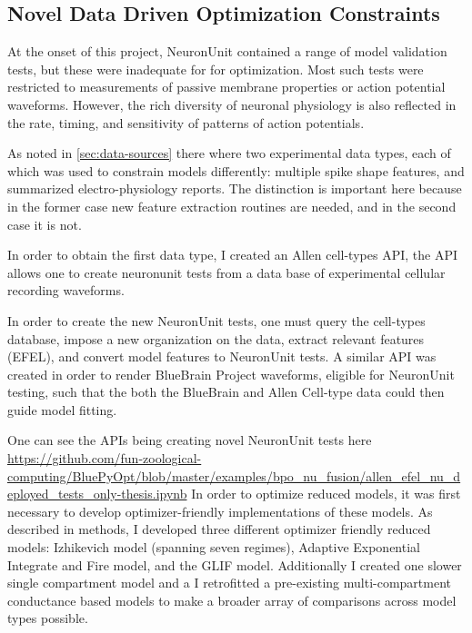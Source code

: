 \subsection{Novel Data Driven Optimization Constraints}
At the onset of this project, NeuronUnit contained a range of model validation tests, but these were inadequate for for optimization.
Most such tests were restricted to measurements of passive membrane properties or action potential waveforms.
However, the rich diversity of neuronal physiology is also reflected in the rate, timing, and sensitivity of patterns of action potentials.

As noted in \ref{sec:data-sources} there where two experimental data types, each of which was used to constrain models differently: multiple spike shape features, and summarized electro-physiology reports. The distinction is important here because in the former case new feature extraction routines are needed, and in the second case it is not.

In order to obtain the first data type, I created an Allen cell-types API, the API allows one to create neuronunit tests from a data base of experimental cellular recording waveforms.

In order to create the new NeuronUnit tests, one must query the cell-types database, impose a new organization on the data, extract relevant features (EFEL), and convert model features to NeuronUnit tests. A similar API was created in order to render BlueBrain Project waveforms, eligible for NeuronUnit testing, such that the both the BlueBrain \cite{toledo} and Allen Cell-type data could then guide model fitting. %

One can see the APIs being creating novel NeuronUnit tests here \url{https://github.com/fun-zoological-computing/BluePyOpt/blob/master/examples/bpo_nu_fusion/allen_efel_nu_deployed_tests_only-thesis.ipynb}
In order to optimize reduced models, it was first necessary to develop optimizer-friendly implementations of these models. As described in methods, I developed three different optimizer friendly reduced models: Izhikevich model (spanning seven regimes), Adaptive Exponential Integrate and Fire model, and the GLIF model. Additionally I created one slower single compartment model and a I retrofitted a pre-existing multi-compartment conductance based models to make a broader array of comparisons across model types possible.

